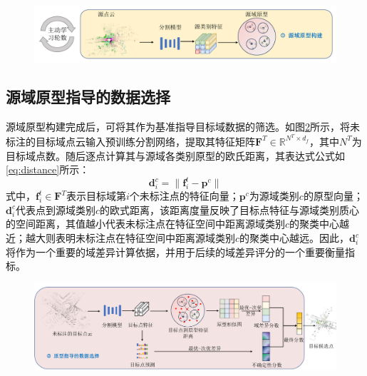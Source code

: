 \vspace{-0.1cm}
\begin{figure}[h]
    \centering
    \includegraphics[width = \textwidth]{ljx/figure/3-2.pdf}
    \label{fig:3-2}
\end{figure}
\vspace{-0.35cm}


\subsection{源域原型指导的数据选择}
源域原型构建完成后，可将其作为基准指导目标域数据的筛选。如图\ref{fig:3-3}所示，将未标注的目标域点云输入预训练分割网络，提取其特征矩阵\( \mathbf{F}^T \in \mathbb{R}^{N^T \times d_f} \)，其中\(N^T\)为目标域点数。随后逐点计算其与源域各类别原型的欧氏距离，其表达式公式如\eqref{eq:distance}所示：
\begin{equation}
    \label{eq:distance}
    \mathbf{d}_i^c = \| \mathbf{f}_i^t - \mathbf{p}^c \|
\end{equation}
式中，\( \mathbf{f}_i^t \in \mathbf{F}^T \)表示目标域第\( i \)个未标注点的特征向量；\(\mathbf{p}^c\)为源域类别\(c\)的原型向量；\( \mathbf{d}_i^c \)代表点到源域类别\(c\)的欧式距离，该距离度量反映了目标点特征与源域类别质心的空间距离，其值越小代表未标注点在特征空间中距离源域类别\( c \)的聚类中心越近；越大则表明未标注点在特征空间中距离源域类别\( c \)的聚类中心越远。因此，$\mathbf{d}_i^c$将作为一个重要的域差异计算依据，并用于后续的域差异评分的一个重要衡量指标。

\begin{figure}[H]
    \vspace{-0.2cm}
    \centering
    \includegraphics[width = \textwidth]{ljx/figure/3-3.pdf}
    \label{fig:3-3}
    \vspace{-0.45cm}
\end{figure}

